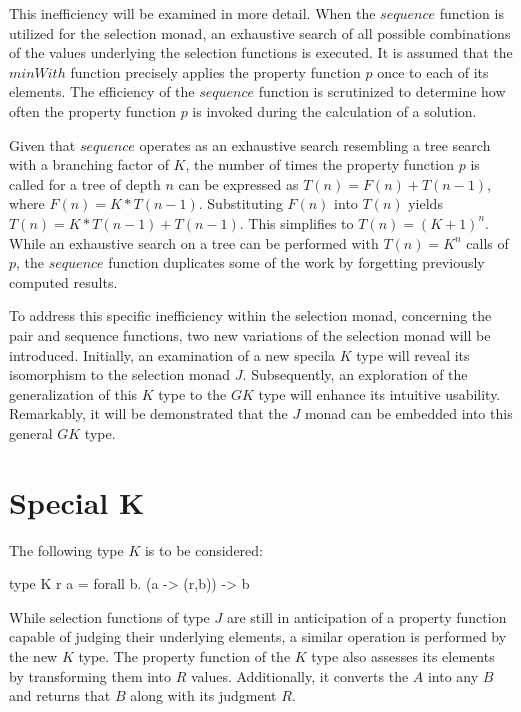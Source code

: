 \documentclass[runningheads]{llncs}
\begin{document}
This inefficiency will be examined in more detail. When the \(sequence\)
function is utilized for the selection monad, an exhaustive search of
all possible combinations of the values underlying the selection
functions is executed. It is assumed that the \(minWith\) function
precisely applies the property function \(p\) once to each of its
elements. The efficiency of the \(sequence\) function is scrutinized to
determine how often the property function \(p\) is invoked during the
calculation of a solution.

Given that \(sequence\) operates as an exhaustive search resembling a
tree search with a branching factor of \(K\), the number of times the
property function \(p\) is called for a tree of depth \(n\) can be
expressed as \(T(n) = F(n) + T(n-1)\), where \(F(n) = K * T(n-1)\).
Substituting \(F(n)\) into \(T(n)\) yields
\(T(n) = K * T(n-1) + T(n-1)\). This simplifies to \(T(n) = (K + 1)^n\).
While an exhaustive search on a tree can be performed with
\(T(n) = K^n\) calls of \(p\), the \(sequence\) function duplicates some
of the work by forgetting previously computed results.

To address this specific inefficiency within the selection monad,
concerning the pair and sequence functions, two new variations of the
selection monad will be introduced. Initially, an examination of a new
specila \(K\) type will reveal its isomorphism to the selection monad
\(J\). Subsequently, an exploration of the generalization of this \(K\)
type to the \(GK\) type will enhance its intuitive usability.
Remarkably, it will be demonstrated that the \(J\) monad can be embedded
into this general \(GK\) type.

\section{Special K}\label{special-k}

The following type \(K\) is to be considered:

\begin{code}
type K r a = forall b. (a -> (r,b)) -> b
\end{code}

While selection functions of type \(J\) are still in anticipation of a
property function capable of judging their underlying elements, a
similar operation is performed by the new \(K\) type. The property
function of the \(K\) type also assesses its elements by transforming
them into \(R\) values. Additionally, it converts the \(A\) into any
\(B\) and returns that \(B\) along with its judgment \(R\).
\end{document}

